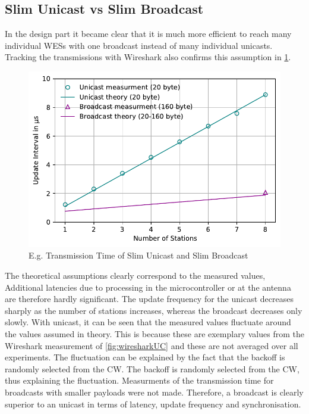 \subsection*{Slim Unicast vs Slim Broadcast}

In the design part it became clear that it is much more efficient 
to reach many individual WESs with one broadcast instead of many individual unicasts.
Tracking the transmissions with Wireshark also confirms this assumption in \cref{fig:transmissionTime}.

\begin{figure}[h]
	\centering
	\includegraphics[scale=0.6]{../Plot2/Graphs/bc_uc_transmissiontime_wireshark.pdf}
	\caption{E.g. Transmission Time of Slim Unicast and Slim Broadcast}
	\label{fig:transmissionTime}
\end{figure}

The theoretical assumptions clearly correspond to the measured values,
Additional latencies due to processing in the microcontroller or at the antenna are therefore hardly significant.
The update frequency for the unicast decreases sharply as the number of stations increases,
whereas the broadcast decreases only slowly. 
With unicast, it can be seen that the measured values fluctuate around the values assumed in theory.
This is because these are exemplary values from the Wireshark measurement of \cref{fig:wiresharkUC} 
and these are not averaged over all experiments.
The fluctuation can be explained by the fact that the backoff is randomly selected from the \ac{CW}.
The backoff is randomly selected from the \ac{CW}, thus explaining the fluctuation.
Measurments of the transmission time for broadcasts with smaller payloads were not made.
Therefore, a broadcast is clearly superior to an unicast in terms of latency,
update frequency and synchronisation.


